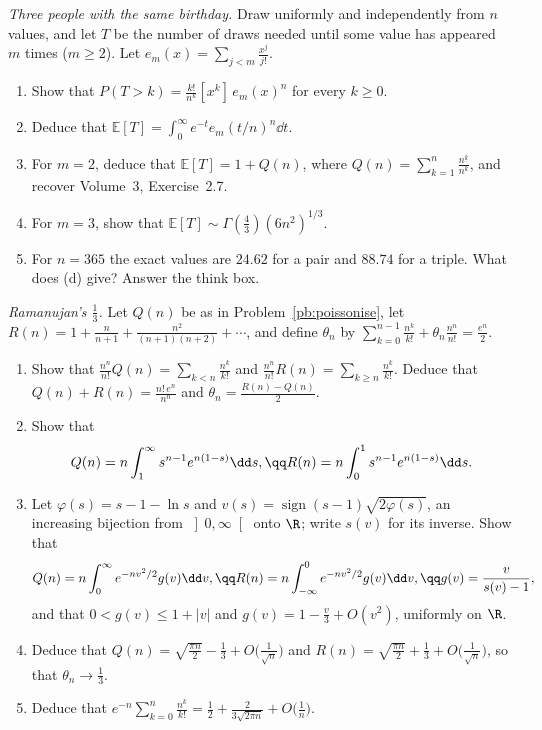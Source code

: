 \begin{exercise}[$\star\star$]\label{pb:poissonise}
\emph{Three people with the same birthday.} Draw uniformly and independently from $n$ values, and let $T$ be the number of draws needed
until some value has appeared $m$ times ($m\ge2$). Let $e_m(x)=\sum_{j<m}\frac{x^j}{j!}$.
\begin{enumerate}[label=(\alph*)]
\item Show that $P(T>k)=\frac{k!}{n^k}[x^k]\,e_m(x)^n$ for every $k\ge0$.
\item Deduce that $\mathbb E[T]=\int_0^\infty e^{-t}e_m(t/n)^n\dd t$.
\item For $m=2$, deduce that $\mathbb E[T]=1+Q(n)$, where $Q(n)=\sum_{k=1}^n\frac{n^{\underline k}}{n^k}$, and recover Volume~3, Exercise~2.7.
\item For $m=3$, show that $\mathbb E[T]\sim\Gamma(\frac43)(6n^2)^{1/3}$.
\item For $n=365$ the exact values are $24.62$ for a pair and $88.74$ for a triple. What does (d) give? Answer the think box.
\end{enumerate}
\end{exercise}

\begin{exercise}[$\star\star\star$]\label{pb:ramanujan}
\emph{Ramanujan's $\frac13$.} Let $Q(n)$ be as in Problem~\ref{pb:poissonise}, let $R(n)=1+\frac n{n+1}+\frac{n^2}{(n+1)(n+2)}+\cdots$, and define $\theta_n$ by
$\sum_{k=0}^{n-1}\frac{n^k}{k!}+\theta_n\frac{n^n}{n!}=\frac{e^n}2$.
\begin{enumerate}[label=(\alph*)]
\item Show that $\frac{n^n}{n!}Q(n)=\sum_{k<n}\frac{n^k}{k!}$ and $\frac{n^n}{n!}R(n)=\sum_{k\ge n}\frac{n^k}{k!}$. Deduce that $Q(n)+R(n)=\frac{n!\,e^n}{n^n}$ and $\theta_n=\frac{R(n)-Q(n)}2$.
\item Show that
\[
Q(n)=n\int_1^\infty s^{n-1}e^{n(1-s)}\dd s,\qq R(n)=n\int_0^1s^{n-1}e^{n(1-s)}\dd s.
\]
\item Let $\varphi(s)=s-1-\ln s$ and $v(s)=\operatorname{sign}(s-1)\sqrt{2\varphi(s)}$, an increasing bijection from $\left]0,\infty\right[$ onto $\R$; write $s(v)$ for its inverse.
Show that
\[
Q(n)=n\int_0^\infty e^{-nv^2/2}g(v)\dd v,\qq R(n)=n\int_{-\infty}^0e^{-nv^2/2}g(v)\dd v,\qq g(v)=\frac v{s(v)-1},
\]
and that $0<g(v)\le1+|v|$ and $g(v)=1-\frac v3+O(v^2)$, uniformly on $\R$.
\item Deduce that $Q(n)=\sqrt{\frac{\pi n}2}-\frac13+O\bigl(\frac1{\sqrt n}\bigr)$ and $R(n)=\sqrt{\frac{\pi n}2}+\frac13+O\bigl(\frac1{\sqrt n}\bigr)$, so that $\theta_n\to\frac13$.
\item Deduce that $e^{-n}\sum_{k=0}^n\frac{n^k}{k!}=\frac12+\frac2{3\sqrt{2\pi n}}+O\bigl(\frac1n\bigr)$.
\end{enumerate}
\end{exercise}

